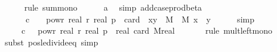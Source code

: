 \begin{isabellebody}
\ \ \ \ \isamarkupfalse%
\ {\isacharparenleft}{\kern0pt}rule\ sum{\isacharunderscore}{\kern0pt}mono{\isacharparenright}{\kern0pt}\isanewline
\ \ \ \ \isamarkupfalse%
\ a{}\ \isamarkupfalse%
\ {\isacharparenleft}{\kern0pt}simp\ add{\isacharcolon}{\kern0pt}case{\isacharunderscore}{\kern0pt}prod{\isacharunderscore}{\kern0pt}beta{\isacharparenright}{\kern0pt}\isanewline
\ \ \isamarkupfalse%
\ \isamarkupfalse%
\ {\isachardoublequoteopen}{\isachardot}{\kern0pt}{\isachardot}{\kern0pt}{\isachardot}{\kern0pt}\ {\isacharequal}{\kern0pt}\ \ {\isacharparenleft}{\kern0pt}{}{}\ {\isacharasterisk}{\kern0pt}\ c\ \ {\isacharasterisk}{\kern0pt}\ {}\ powr\ {\isacharparenleft}{\kern0pt}{\isacharminus}{\kern0pt}real\ r{\isacharparenright}{\kern0pt}\ {\isacharslash}{\kern0pt}{\isacharparenleft}{\kern0pt}real\ p{\isacharparenright}{\kern0pt}\ {\isacharasterisk}{\kern0pt}\ card\ \ {\isacharbraceleft}{\kern0pt}{\isacharparenleft}{\kern0pt}x{\isacharcomma}{\kern0pt}y{\isacharparenright}{\kern0pt}\ {\isasymin}\ M\ {\isasymtimes}\ M{\isachardot}{\kern0pt}\ x\ {\isacharless}{\kern0pt}\ y{\isacharbraceright}{\kern0pt}{\isachardoublequoteclose}\isanewline
\ \ \ \ \isamarkupfalse%
\ simp\isanewline
\ \ \isamarkupfalse%
\ \isamarkupfalse%
\ {\isachardoublequoteopen}{\isachardot}{\kern0pt}{\isachardot}{\kern0pt}{\isachardot}{\kern0pt}\ {\isasymle}\ {\isacharparenleft}{\kern0pt}{}{}\ {\isacharasterisk}{\kern0pt}\ c\ {\isacharasterisk}{\kern0pt}\ {}\ powr\ {\isacharparenleft}{\kern0pt}{\isacharminus}{\kern0pt}real\ r{\isacharparenright}{\kern0pt}\ {\isacharslash}{\kern0pt}{\isacharparenleft}{\kern0pt}real\ p{\isacharparenright}{\kern0pt}\ {\isacharasterisk}{\kern0pt}\ {\isacharparenleft}{\kern0pt}{\isacharparenleft}{\kern0pt}real\ {\isacharparenleft}{\kern0pt}card\ M{\isacharparenright}{\kern0pt}{\isacharparenright}{\kern0pt}real\ {}{\isacharparenright}{\kern0pt}{\isachardoublequoteclose}\isanewline
\ \ \ \ \isamarkupfalse%
\ {\isacharparenleft}{\kern0pt}rule\ mult{\isacharunderscore}{\kern0pt}left{\isacharunderscore}{\kern0pt}mono{\isacharparenright}{\kern0pt}\isanewline
\ \ \ \ \ \isamarkupfalse%
\ {\isacharparenleft}{\kern0pt}subst\ pos{\isacharunderscore}{\kern0pt}le{\isacharunderscore}{\kern0pt}divide{\isacharunderscore}{\kern0pt}eq{\isacharcomma}{\kern0pt}\ simp{\isacharparenright}{\kern0pt}\isanewline

\end{isabellebody}
